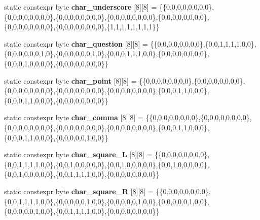 \begin{DoxyCompactItemize}
\item 
static constexpr byte {\bfseries char\+\_\+underscore} \mbox{[}8\mbox{]}\mbox{[}8\mbox{]} = \{\{0,0,0,0,0,0,0,0\},\{0,0,0,0,0,0,0,0\},\{0,0,0,0,0,0,0,0\},\{0,0,0,0,0,0,0,0\},\{0,0,0,0,0,0,0,0\},\{0,0,0,0,0,0,0,0\},\{0,0,0,0,0,0,0,0\},\{1,1,1,1,1,1,1,1\}\}\hypertarget{classcharacters_aa47729b94ad07281ed6b6539a48ef525}{}\label{classcharacters_aa47729b94ad07281ed6b6539a48ef525}

\item 
static constexpr byte {\bfseries char\+\_\+question} \mbox{[}8\mbox{]}\mbox{[}8\mbox{]} = \{\{0,0,0,0,0,0,0,0\},\{0,0,1,1,1,1,0,0\},\{0,0,0,0,0,0,1,0\},\{0,0,0,0,0,0,1,0\},\{0,0,0,1,1,1,0,0\},\{0,0,0,0,0,0,0,0\},\{0,0,0,1,0,0,0,0\},\{0,0,0,0,0,0,0,0\}\}\hypertarget{classcharacters_a84c04a98b8bbf4191e2e798de95ab7a1}{}\label{classcharacters_a84c04a98b8bbf4191e2e798de95ab7a1}

\item 
static constexpr byte {\bfseries char\+\_\+point} \mbox{[}8\mbox{]}\mbox{[}8\mbox{]} = \{\{0,0,0,0,0,0,0,0\},\{0,0,0,0,0,0,0,0\},\{0,0,0,0,0,0,0,0\},\{0,0,0,0,0,0,0,0\},\{0,0,0,0,0,0,0,0\},\{0,0,0,1,1,0,0,0\},\{0,0,0,1,1,0,0,0\},\{0,0,0,0,0,0,0,0\}\}\hypertarget{classcharacters_aad1e373e5dd898bedffbccba83793925}{}\label{classcharacters_aad1e373e5dd898bedffbccba83793925}

\item 
static constexpr byte {\bfseries char\+\_\+comma} \mbox{[}8\mbox{]}\mbox{[}8\mbox{]} = \{\{0,0,0,0,0,0,0,0\},\{0,0,0,0,0,0,0,0\},\{0,0,0,0,0,0,0,0\},\{0,0,0,0,0,0,0,0\},\{0,0,0,0,0,0,0,0\},\{0,0,0,1,1,0,0,0\},\{0,0,0,1,1,0,0,0\},\{0,0,0,0,0,1,0,0\}\}\hypertarget{classcharacters_a33093db1edaafedcb2601ca8e414d486}{}\label{classcharacters_a33093db1edaafedcb2601ca8e414d486}

\item 
static constexpr byte {\bfseries char\+\_\+square\+\_\+L} \mbox{[}8\mbox{]}\mbox{[}8\mbox{]} = \{\{0,0,0,0,0,0,0,0\},\{0,0,1,1,1,1,0,0\},\{0,0,1,0,0,0,0,0\},\{0,0,1,0,0,0,0,0\},\{0,0,1,0,0,0,0,0\},\{0,0,1,0,0,0,0,0\},\{0,0,1,1,1,1,0,0\},\{0,0,0,0,0,0,0,0\}\}\hypertarget{classcharacters_a3868acaac71b68824888d48d3161c1a5}{}\label{classcharacters_a3868acaac71b68824888d48d3161c1a5}

\item 
static constexpr byte {\bfseries char\+\_\+square\+\_\+R} \mbox{[}8\mbox{]}\mbox{[}8\mbox{]} = \{\{0,0,0,0,0,0,0,0\},\{0,0,1,1,1,1,0,0\},\{0,0,0,0,0,1,0,0\},\{0,0,0,0,0,1,0,0\},\{0,0,0,0,0,1,0,0\},\{0,0,0,0,0,1,0,0\},\{0,0,1,1,1,1,0,0\},\{0,0,0,0,0,0,0,0\}\}\hypertarget{classcharacters_a4b4ffc85bbe0058a74ceea1dbf1e65ef}{}\label{classcharacters_a4b4ffc85bbe0058a74ceea1dbf1e65ef}


\end{DoxyCompactItemize}
